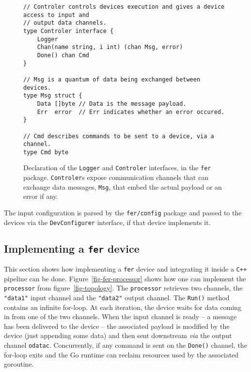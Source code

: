 \documentclass{webofc}
\begin{document}
\begin{figure}[h]
	\centering
	\begin{verbatim}
// Controler controls devices execution and gives a device access to input and
// output data channels.
type Controler interface {
	Logger
	Chan(name string, i int) (chan Msg, error)
	Done() chan Cmd
}

// Msg is a quantum of data being exchanged between devices.
type Msg struct {
	Data []byte // Data is the message payload.
	Err  error  // Err indicates whether an error occured.
}

// Cmd describes commands to be sent to a device, via a channel.
type Cmd byte
	\end{verbatim}
	\caption{Declaration of the \texttt{Logger} and \texttt{Controler} interfaces, in the \texttt{fer} package.
	\texttt{Controler}s expose communication channels that can exchange data messages, \texttt{Msg}, that embed the actual payload or an error if any.
}
	\label{fig-fer-controler}
\end{figure}

The input configuration is parsed by the \texttt{fer/config} package and passed to the devices via the \texttt{DevConfigurer} interface, if that device implements it.

\subsection{Implementing a \texttt{fer} device}
This section shows how implementing a \texttt{fer} device and integrating it inside a \texttt{C++} pipeline can be done.
Figure~\ref{fig-fer-processor} shows how one can implement the \texttt{processor} from figure~\ref{fig-topology}.
The \texttt{processor} retrieves two channels, the \texttt{"data1"} input channel and the \texttt{"data2"} output channel.
The \texttt{Run()} method contains an infinite for-loop.
At each iteration, the device waits for data coming in from one of the two channels.
When the input channel is ready -- a message has been delivered to the device -- the associated payload is modified by the device (just appending some data) and then sent downstream \emph{via} the output channel \texttt{odatac}.
Concurrently, if any command is sent on the \texttt{Done()} channel, the for-loop exits and the Go runtime can reclaim resources used by the associated goroutine.
\end{document}
